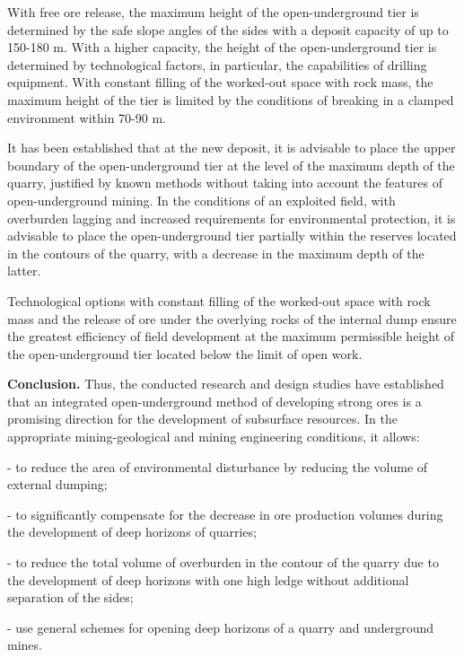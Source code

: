 \begin{multicols}{2}
With free ore release, the maximum height of the open-underground tier
is determined by the safe slope angles of the sides with a deposit
capacity of up to 150-180 m. With a higher capacity, the height of the
open-underground tier is determined by technological factors, in
particular, the capabilities of drilling equipment. With constant
filling of the worked-out space with rock mass, the maximum height of
the tier is limited by the conditions of breaking in a clamped
environment within 70-90 m.

It has been established that at the new deposit, it is advisable to
place the upper boundary of the open-underground tier at the level of
the maximum depth of the quarry, justified by known methods without
taking into account the features of open-underground mining. In the
conditions of an exploited field, with overburden lagging and increased
requirements for environmental protection, it is advisable to place the
open-underground tier partially within the reserves located in the
contours of the quarry, with a decrease in the maximum depth of the
latter.

Technological options with constant filling of the worked-out space with
rock mass and the release of ore under the overlying rocks of the
internal dump ensure the greatest efficiency of field development at the
maximum permissible height of the open-underground tier located below
the limit of open work.

{\bfseries Conclusion.} Thus, the conducted research and design studies
have established that an integrated open-underground method of
developing strong ores is a promising direction for the development of
subsurface resources. In the appropriate mining-geological and mining
engineering conditions, it allows:

- to reduce the area of environmental disturbance by reducing the volume
of external dumping;

- to significantly compensate for the decrease in ore production volumes
during the development of deep horizons of quarries;

- to reduce the total volume of overburden in the contour of the quarry
due to the development of deep horizons with one high ledge without
additional separation of the sides;

- use general schemes for opening deep horizons of a quarry and
underground mines.


\end{multicols}
